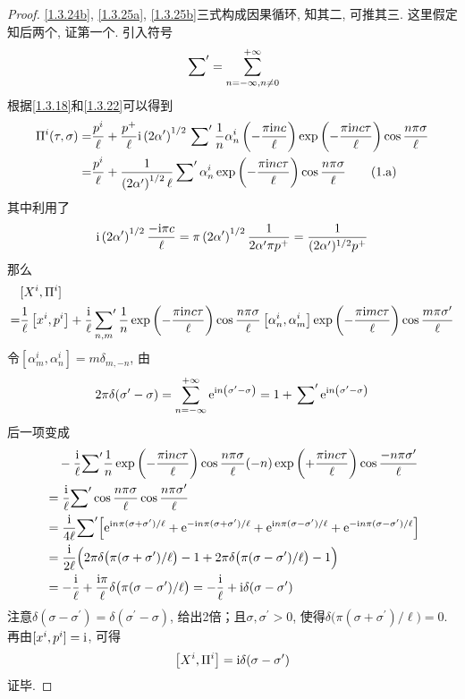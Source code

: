 \begin{proof}
    \eqref{1.3.24b}, \eqref{1.3.25a}, \eqref{1.3.25b}三式构成因果循环, 知其二, 可推其三. 这里假定知后两个, 证第一个. 引入符号
\[\sideset{}{'}\sum={\sum_{n=-\infty, n \neq 0}^{+\infty} }\]
根据\eqref{1.3.18}和\eqref{1.3.22}可以得到
\begin{align}
\Pi^{i}(\tau, \sigma)
=&\frac{p^{i}}{\ell}+\frac{p^+}{\ell}\mathrm{i} \left(2 \alpha^{\prime}\right)^{1 / 2} \sideset{}{'}\sum \frac{1}{n} \alpha_{n}^{i}\left(-\frac{\pi \mathrm{i} n c}{\ell}\right) \exp \left(-\frac{\pi \mathrm{i} n c \tau}{\ell}\right) \cos \frac{n \pi \sigma}{\ell} \nonumber \\
=&\frac{p^ i}{\ell}+\frac{1}{\left(2 \alpha^{\prime}\right)^{1 / 2} \ell} \sideset{}{'}\sum \alpha_{n}^{i} \exp \left(-\frac{\pi \mathrm{i} n c\tau}{\ell}\right) \cos \frac{n \pi \sigma}{\ell} \tag{1.a} \label{1.a}
\end{align}
其中利用了
\[
\mathrm{i}\left(2 \alpha^{\prime }\right)^{1 / 2} \frac{-\mathrm{i} \pi c}{\ell}=\pi\left(2 \alpha^{\prime}\right)^{1 / 2} \frac{1}{2 \alpha^{\prime} \pi p^{+}}=\frac{1}{(2 \alpha^\prime)^{1 / 2} p^{+}}
\]
那么
\[
\begin{aligned}
&[X^{i} , \Pi^{i}]\\
=&\frac{1}{\ell}\left[x^{i} , p^{i}\right]+\frac{\mathrm{i}}{\ell } \sideset{}{'}\sum_{n,m} \frac{1}{n} \exp \left(-\frac{\pi \mathrm{i} n c \tau}{\ell}\right) \cos \frac{n \pi \sigma}{\ell}
\left[\alpha_{n}^{i}, \alpha_{m}^{i}\right] \exp \left(-\frac{\pi \mathrm{i} m c \tau}{\ell}\right) \cos \frac{m \pi\sigma^\prime}{\ell}
\end{aligned}
\]
令$\left[\alpha_{m}^{i}, \alpha_{n}^{i}\right]=m \delta_{m,-n}$, 由
\[
2\pi\delta(\sigma^{\prime}-\sigma)=\sum_{n=-\infty}^{+\infty} \mathrm{e}^{ \mathrm{i} n\left(\sigma^{\prime}-\sigma\right)}
=1+\sideset{}{'}\sum \mathrm{e}^{ \mathrm{i} n \left(\sigma^{\prime}-\sigma\right)}
\]
后一项变成
\begin{align*}
&\quad -\frac{\mathrm{i}}{\ell} {\sum}^\prime \frac{1}{n} \exp \left(-\frac{\pi \mathrm{i} n c \tau}{\ell}\right) \cos \frac{n \pi \sigma}{\ell}(-n)  \exp \left(+\frac{\pi \mathrm{i} n c \tau}{\ell}\right) \cos \frac{-n \pi \sigma^\prime}{\ell}\\
&=\frac{\mathrm{i}}{\ell} {\sum}^\prime \cos\frac{n \pi \sigma}{\ell} \cos \frac{n \pi \sigma^{\prime}}{\ell} \\
&=\frac{\mathrm{i}}{ 4\ell}  {\sum}^\prime \Bigl[\mathrm{e}^{\mathrm{i} n \pi(\sigma+\sigma^{\prime})/\ell}+\mathrm{e}^{-\mathrm{i} n \pi(\sigma+\sigma^{\prime})/\ell}+ \mathrm{e}^{\mathrm{i} n \pi(\sigma-\sigma^{\prime})/\ell}+\mathrm{e}^{-\mathrm{i} n \pi(\sigma-\sigma^{\prime})/\ell}\Bigr]\\
&=\frac{\mathrm{i}}{2\ell} \Bigl( 2\pi\delta\bigl(\pi(\sigma+\sigma^{\prime})/\ell\bigr)-1+2\pi\delta\bigl(\pi(\sigma-\sigma^{\prime})/\ell\bigr)-1 \Bigr) \\
&=-\frac{\mathrm{i}}{\ell}+\frac{\mathrm{i} \pi}{ \ell} \delta\bigl(\pi(\sigma-\sigma^{\prime})/\ell\bigr) 
=-\frac{\mathrm{i}}{\ell}+\mathrm{i} \delta(\sigma-\sigma^{\prime})
\end{align*}
注意$\delta(\sigma-\sigma^\prime)=\delta(\sigma^\prime-\sigma)$, 给出2倍；且$\sigma,\sigma^\prime>0$, 使得$\delta\bigl(\pi(\sigma+\sigma^{\prime})/\ell\bigr)=0$. 再由$[x^{i}, p^{i}]=\mathrm{i}$, 可得
$$\left[X^{i} , \Pi^{i}\right]=\mathrm{i} \delta(\sigma-\sigma^{\prime})$$ 
证毕. 
\end{proof}
